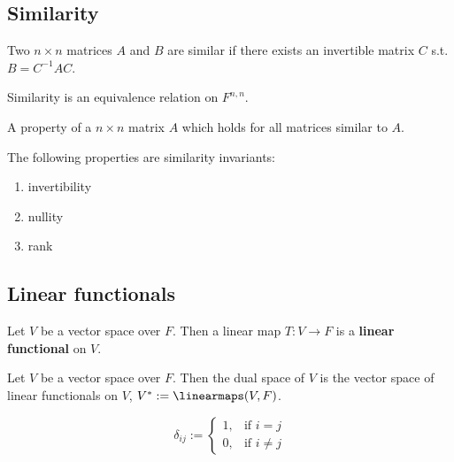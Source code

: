 \subsection{Similarity}

\begin{definition}
  Two $n \times n$ matrices $A$ and $B$ are similar if there exists an invertible matrix $C$ s.t. $B = C^{-1} A C$.

  Similarity is an equivalence relation on $F^{n,n}$.
\end{definition}

\begin{definition}
  A property of a $n \times n$ matrix $A$ which holds for all matrices similar to $A$.
\end{definition}

\begin{theorem}
  The following properties are similarity invariants:
  \begin{enumerate}
    \item invertibility
    \item nullity
    \item rank
  \end{enumerate}
\end{theorem}

\subsection{Linear functionals}

\begin{definition}
  Let $V$ be a vector space over $F$. Then a linear map $T : V \to F$ is a \textbf{linear functional} on $V$.
\end{definition}

\begin{definition}
  Let $V$ be a vector space over $F$. Then the dual space of $V$ is the vector space of linear functionals on $V$, $V^* := \linearmaps(V, F)$.
\end{definition}

\begin{definition}
  \[
    \delta_{ij} := \begin{cases}
      1, & \text{if $i = j$} \\
      0, & \text{if $i \neq j$}
    \end{cases}
  \]
\end{definition}

